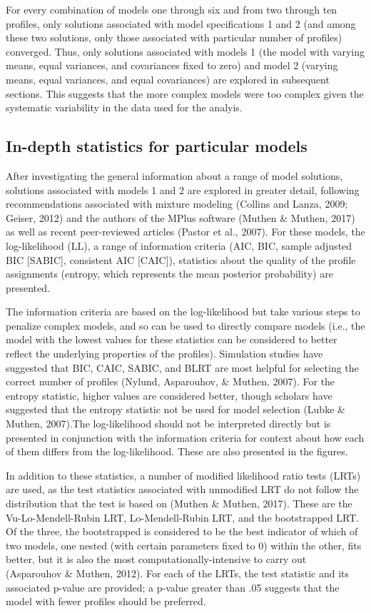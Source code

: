 \documentclass[]{msu-thesis}
\theoremstyle{definition}
\theoremstyle{definition}
\theoremstyle{definition}
\theoremstyle{remark}
\begin{document}
For every combination of models one through six and from two through ten
profiles, only solutions associated with model specifications 1 and 2
(and among these two solutions, only those associated with particular
number of profiles) converged. Thus, only solutions associated with
models 1 (the model with varying means, equal variances, and covariances
fixed to zero) and model 2 (varying means, equal variances, and equal
covariances) are explored in subsequent sections. This suggests that the
more complex models were too complex given the systematic variability in
the data used for the analyis.

\subsection{In-depth statistics for particular
models}\label{in-depth-statistics-for-particular-models}

After investigating the general information about a range of model
solutions, solutions associated with models 1 and 2 are explored in
greater detail, following recommendations associated with mixture
modeling (Collins and Lanza, 2009; Geiser, 2012) and the authors of the
MPlus software (Muthen \& Muthen, 2017) as well as recent peer-reviewed
articles (Pastor et al., 2007). For these models, the log-likelihood
(LL), a range of information criteria (AIC, BIC, sample adjusted BIC
{[}SABIC{]}, consistent AIC {[}CAIC{]}), statistics about the quality of
the profile assignments (entropy, which represents the mean posterior
probability) are presented.

The information criteria are based on the log-likelihood but take
various steps to penalize complex models, and so can be used to directly
compare models (i.e., the model with the lowest values for these
statistics can be considered to better reflect the underlying properties
of the profiles). Simulation studies have suggested that BIC, CAIC,
SABIC, and BLRT are most helpful for selecting the correct number of
profiles (Nylund, Asparouhov, \& Muthen, 2007). For the entropy
statistic, higher values are considered better, though scholars have
suggested that the entropy statistic not be used for model selection
(Lubke \& Muthen, 2007).The log-likelihood should not be interpreted
directly but is presented in conjunction with the information criteria
for context about how each of them differs from the log-likelihood.
These are also presented in the figures.

In addition to these statistics, a number of modified likelihood ratio
tests (LRTs) are used, as the test statistics associated with unmodified
LRT do not follow the distribution that the test is based on (Muthen \&
Muthen, 2017). These are the Vu-Lo-Mendell-Rubin LRT, Lo-Mendell-Rubin
LRT, and the bootstrapped LRT. Of the three, the bootstrapped is
considered to be the best indicator of which of two models, one nested
(with certain parameters fixed to 0) within the other, fits better, but
it is also the most computationally-intensive to carry out (Asparouhov
\& Muthen, 2012). For each of the LRTs, the test statistic and its
associated p-value are provided; a p-value greater than .05 suggests
that the model with fewer profiles should be preferred.
\end{document}
